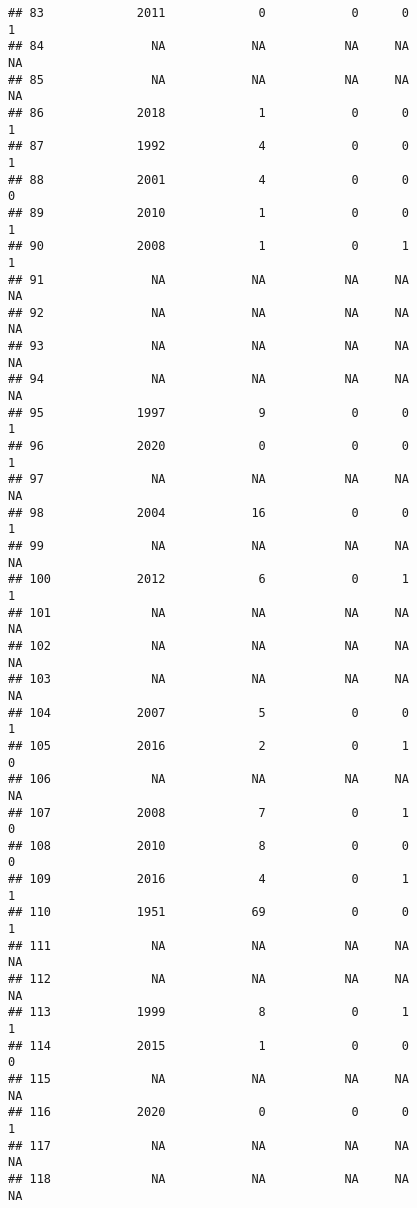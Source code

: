 \documentclass[
  english,
  man]{apa6}
\begin{document}
\begin{verbatim}
## 83             2011             0            0      0               1
## 84               NA            NA           NA     NA              NA
## 85               NA            NA           NA     NA              NA
## 86             2018             1            0      0               1
## 87             1992             4            0      0               1
## 88             2001             4            0      0               0
## 89             2010             1            0      0               1
## 90             2008             1            0      1               1
## 91               NA            NA           NA     NA              NA
## 92               NA            NA           NA     NA              NA
## 93               NA            NA           NA     NA              NA
## 94               NA            NA           NA     NA              NA
## 95             1997             9            0      0               1
## 96             2020             0            0      0               1
## 97               NA            NA           NA     NA              NA
## 98             2004            16            0      0               1
## 99               NA            NA           NA     NA              NA
## 100            2012             6            0      1               1
## 101              NA            NA           NA     NA              NA
## 102              NA            NA           NA     NA              NA
## 103              NA            NA           NA     NA              NA
## 104            2007             5            0      0               1
## 105            2016             2            0      1               0
## 106              NA            NA           NA     NA              NA
## 107            2008             7            0      1               0
## 108            2010             8            0      0               0
## 109            2016             4            0      1               1
## 110            1951            69            0      0               1
## 111              NA            NA           NA     NA              NA
## 112              NA            NA           NA     NA              NA
## 113            1999             8            0      1               1
## 114            2015             1            0      0               0
## 115              NA            NA           NA     NA              NA
## 116            2020             0            0      0               1
## 117              NA            NA           NA     NA              NA
## 118              NA            NA           NA     NA              NA

\end{verbatim}
\end{document}
